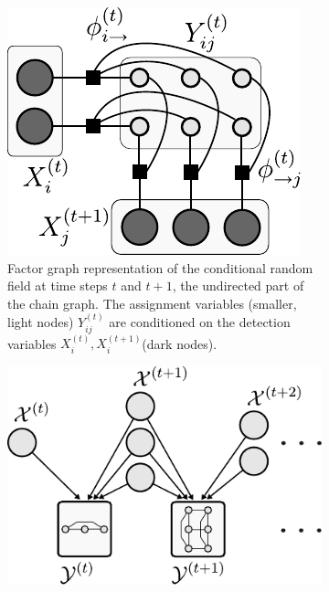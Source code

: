 \begin{figure}[h]
    \centering
    \begin{subfigure}[t]{0.48\textwidth}
        \includegraphics[width=\textwidth]{images/chaingraph/fig_crf_less_nodes.pdf}
        \caption{Factor graph representation of the conditional random field at time steps $t$ and
            $t+1$, \ie the undirected part of the chain graph. The assignment variables (smaller,
            light nodes) $Y_{ij}^{(t)}$ are conditioned on the detection variables
            $X_i^{(t)},X_i^{(t+1)}$(dark nodes).}
        \label{fig:chaingraph-crf}
    \end{subfigure}
    \hfill
    \begin{subfigure}[t]{0.48\textwidth}
        \includegraphics[width=\textwidth]{images/chaingraph/fig_chain_graph.pdf}

\end{subfigure}
\end{figure}
